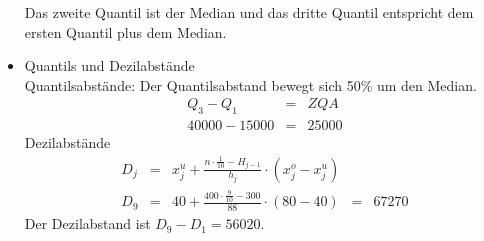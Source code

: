 \begin{itemize}
\begin{equation*}
\end{equation*}
Das zweite Quantil ist der Median und das dritte Quantil entspricht dem ersten Quantil plus dem Median. 
\pagebreak
\item Quantils und Dezilabstände\\
\subitem Quantilsabstände: Der Quantilsabstand bewegt sich 50\% um den Median.
\begin{equation*}
\begin{array}{rcl}
Q_3-Q_1&=&ZQA\\
40000 - 15000&=&25000
\end{array}
\end{equation*}
\subitem Dezilabstände\\
\begin{equation*}
\begin{array}{rcccl}
D_j&=&x_j^u+\displaystyle\frac{n\cdot\frac{1}{10}-H_{j-1}}{h_j}\cdot(x_j^o - x_j^u)&&\\
D_9&=&40+\displaystyle\frac{400\cdot\frac{9}{10}-300}{88}\cdot(80-40)&=&67270
\end{array}
\end{equation*}
Der Dezilabstand ist $D_9-D_1=56020$.
\end{itemize}
